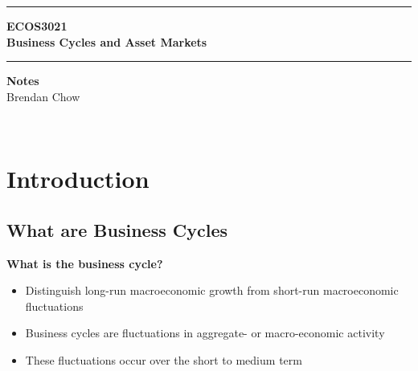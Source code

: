\documentclass[a4paper,twoside]{article}
\numberwithin{equation}{section}
\numberwithin{figure}{section}
\begin{document}
\begin{titlepage}
	\centering
	\vspace*{4.5cm}
	\rule{\linewidth}{2pt}
	\LARGE\textbf{ECOS3021}\\
	\vspace{0.5cm}
	\Huge\textbf{Business Cycles and Asset Markets}\\
	\rule{\linewidth}{2pt}
	\LARGE\textbf{Notes}\\
	\vspace{1.5cm}
	\Large Brendan Chow
	\vfill
\end{titlepage}
	\newpage
	\
	\newpage
	\tableofcontents
	\newpage
{}
\section{Introduction}\label{Sec:1}
\subsection{What are Business Cycles}
	\textbf{What is the business cycle?}
	\begin{itemize}
		\item Distinguish \textcolor{myred}{long-run} macroeconomic \textcolor{myred}{growth} from \textcolor{myblue}{short-run} macroeconomic \textcolor{myblue}{fluctuations}
		\item Business cycles are \textcolor{myblue}{fluctuations} in aggregate- or macro-economic activity
		\item These fluctuations occur over the \textcolor{myblue}{short to medium} term
	\end{itemize}
\end{document}
